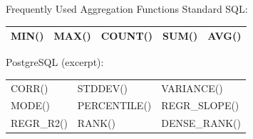 \documentclass[ignorenonframetext,xcolor=x11names]{beamer}
\begin{document}
\begin{frame}[label=full]{Frequently Used Aggregation Functions}
\renewcommand{\arraystretch}{1.5}
Standard SQL: \\

\small
\begin{tabular}{l|l|l|l|l} \hline
MIN() & MAX() & COUNT() & SUM() & AVG() \\ \hline
\end{tabular}
\normalsize

\vspace{\baselineskip}
PostgreSQL (excerpt):\\

\small
\begin{tabular}{l|l|l} \hline
CORR() & STDDEV() & VARIANCE() \\
MODE() & PERCENTILE() & REGR\_SLOPE() \\
REGR\_R2() & RANK() & DENSE\_RANK() \\ \hline
\end{tabular}

\end{frame}
\end{document}

